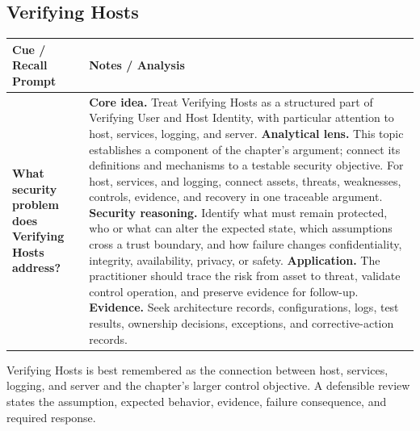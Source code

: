 \documentclass[11pt]{article}
\newcommand{\CornellHeader}{%
\rowcolor{Navy}\color{white}\bfseries Cue / Recall Prompt & \color{white}\bfseries Notes / Analysis\\\hline}
\newcommand{\CornellRow}[2]{%
\cellcolor{CueGray}\RaggedRight\textbf{#1} & \RaggedRight #2\\\hline}
\begin{document}
\subsection*{Verifying Hosts}
\begin{longtable}{>{\RaggedRight\arraybackslash}p{}|>{\RaggedRight\arraybackslash}p{}}
\CornellHeader
\CornellRow{What security problem does Verifying Hosts address?}{\textbf{Core idea.} Treat Verifying Hosts as a structured part of Verifying User and Host Identity, with particular attention to host, services, logging, and server. \textbf{Analytical lens.} This topic establishes a component of the chapter's argument; connect its definitions and mechanisms to a testable security objective. For host, services, and logging, connect assets, threats, weaknesses, controls, evidence, and recovery in one traceable argument. \textbf{Security reasoning.} Identify what must remain protected, who or what can alter the expected state, which assumptions cross a trust boundary, and how failure changes confidentiality, integrity, availability, privacy, or safety. \textbf{Application.} The practitioner should trace the risk from asset to threat, validate control operation, and preserve evidence for follow-up. \textbf{Evidence.} Seek architecture records, configurations, logs, test results, ownership decisions, exceptions, and corrective-action records.}
\end{longtable}
\begin{topicsummary}
Verifying Hosts is best remembered as the connection between host, services, logging, and server and the chapter's larger control objective. A defensible review states the assumption, expected behavior, evidence, failure consequence, and required response.
\end{topicsummary}
\end{document}
